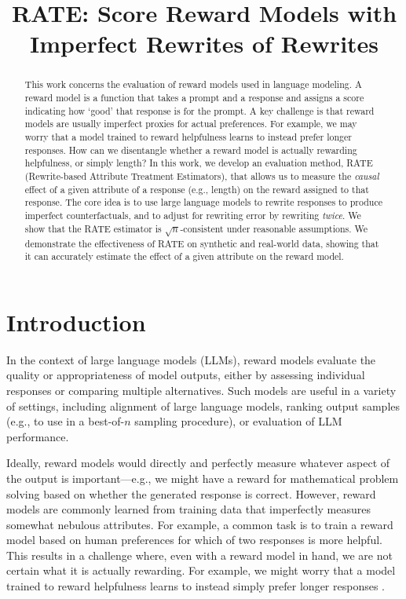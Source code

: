 \documentclass{article}
\title{RATE: Score Reward Models with Imperfect Rewrites of Rewrites}
\begin{document}
\maketitle

\begin{abstract}
This work concerns the evaluation of reward models used in language modeling.  A reward model is a function that takes a prompt and a response and assigns a score indicating how `good' that response is for the prompt. A key challenge is that reward models are usually imperfect proxies for actual preferences. For example, we may worry that a model trained to reward helpfulness learns to instead prefer longer responses. How can we disentangle whether a reward model is actually rewarding helpfulness, or simply length? In this work, we develop an evaluation method, RATE (Rewrite-based Attribute Treatment Estimators), that allows us to measure the \emph{causal} effect of a given attribute of a response (e.g., length) on the reward assigned to that response. The core idea is to use large language models to rewrite responses to produce imperfect counterfactuals, and to adjust for rewriting error by rewriting \emph{twice}. We show that the RATE estimator is $\sqrt{n}$-consistent under reasonable assumptions. We demonstrate the effectiveness of RATE on synthetic and real-world data, showing that it can accurately estimate the effect of a given attribute on the reward model.
\end{abstract}
  
\section{Introduction}
\label{sec:introduction}
In the context of large language models (LLMs), reward models evaluate the quality or appropriateness of model outputs, either by assessing individual responses or comparing multiple alternatives. Such models are useful in a variety of settings, including alignment of large language models, ranking output samples (e.g., to use in a best-of-$n$ sampling procedure), or evaluation of LLM performance.

Ideally, reward models would directly and perfectly measure whatever aspect of the output is important---e.g., we might have a reward for mathematical problem solving based on whether the generated response is correct. 
However, reward models are commonly learned from training data that imperfectly measures somewhat nebulous attributes. For example, a common task is to train a reward model based on human preferences for which of two responses is more helpful.
This results in a challenge where, even with a reward model in hand, we are not certain what it is actually rewarding.
For example, we might worry that a model trained to reward helpfulness learns to instead simply prefer longer responses \citep{shen2023looselipssinkships, park2024disentanglinglengthqualitydirect,singhal2024longwaygoinvestigating}.
\end{document}
